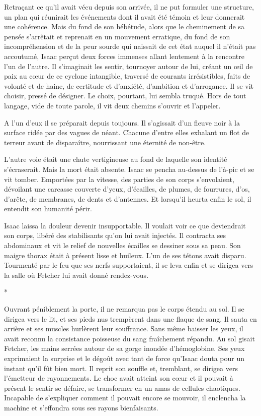 \documentclass[12pt]{book}
\newcommand{\s}{\begin{center}
*
\end{center}
}
\begin{document}
Retraçant ce qu'il avait vécu depuis son arrivée, il ne put formuler une structure, un plan qui réunirait les événements dont il avait été témoin et leur donnerait une cohérence. Mais du fond de son hébétude, alors que le cheminement de sa pensée s'arrêtait et reprenait en un mouvement erratique, du fond de son incompréhension et de la peur sourde qui naissait de cet état auquel il n'était pas accoutumé, Isaac perçut deux forces immenses allant lentement à la rencontre l'un de l'autre. Il s'imaginait les sentir, tournoyer autour de lui, créant un œil de paix au cœur de ce cyclone intangible, traversé de courants irrésistibles, faits de volonté et de haine, de certitude et d'anxiété, d'ambition et d'arrogance. Il se vit choisir, pressé de désigner. Le choix, pourtant, lui sembla truqué. Hors de tout langage, vide de toute parole, il vit deux chemins s'ouvrir et l'appeler.


A l'un d'eux il se préparait depuis toujours. Il s'agissait d'un fleuve noir à la surface ridée par des vagues de néant. Chacune d'entre elles exhalant un flot de terreur avant de disparaître, nourrissant une éternité de non-être.


L'autre voie était une chute vertigineuse au fond de laquelle son identité s'écraserait. Mais la mort était absente. Isaac se pencha au-dessus de l'à-pic et se vit tomber. Emportées par la vitesse, des parties de son corps s'envolaient, dévoilant une carcasse couverte d'yeux, d'écailles, de plumes, de fourrures, d'os, d'arête, de membranes, de dents et d'antennes. Et lorsqu'il heurta enfin le sol, il entendit son humanité périr.


Isaac laissa la douleur devenir insupportable. Il voulait voir ce que deviendrait son corps, libéré des stabilisants qu'on lui avait injectés. Il contracta ses abdominaux et vit le relief de nouvelles écailles se dessiner sous sa peau. Son maigre thorax était à présent lisse et huileux. L'un de ses tétons avait disparu. Tourmenté par le feu que ses nerfs supportaient, il se leva enfin et se dirigea vers la salle où Fetcher lui avait donné rendez-vous.

\s


Ouvrant péniblement la porte, il ne remarqua pas le corps étendu au sol. Il se dirigea vers le lit, et ses pieds nus trempèrent dans une flaque de sang. Il sauta en arrière et ses muscles hurlèrent leur souffrance. Sans même baisser les yeux, il avait reconnu la consistance poisseuse du sang fraîchement répandu. Au sol gisait Fetcher, les mains serrées autour de sa gorge inondée d'hémoglobine. Ses yeux exprimaient la surprise et le dégoût avec tant de force qu'Isaac douta pour un instant qu'il fût bien mort. Il reprit son souffle et, tremblant, se dirigea vers l'émetteur de rayonnements. Le choc avait atteint son cœur et il pouvait à présent le sentir se défaire, se transformer en un amas de cellules chaotiques. Incapable de s'expliquer comment il pouvait encore se mouvoir, il enclencha la machine et s'effondra sous ses rayons bienfaisants.
\end{document}
